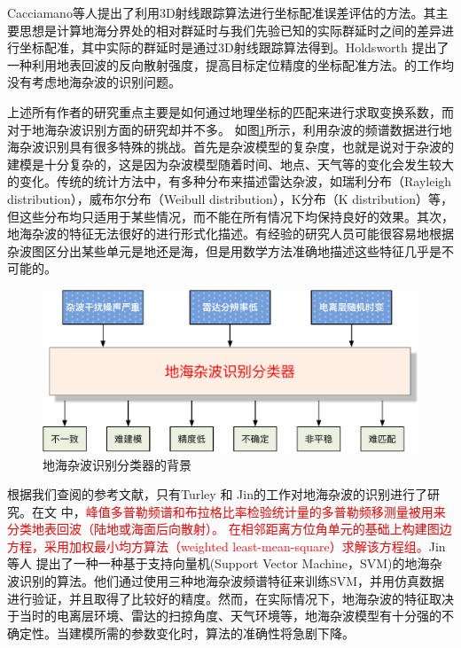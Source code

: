 Cacciamano\cite{cacciamano2012coordinate}等人提出了利用3D射线跟踪算法进行坐标配准误差评估的方法。其主要思想是计算地海分界处的相对群延时与我们先验已知的实际群延时之间的差异进行坐标配准，其中实际的群延时是通过3D射线跟踪算法得到。Holdsworth \cite{holdsworth2017skywave} 提出了一种利用地表回波的反向散射强度，提高目标定位精度的坐标配准方法。\cite{weijers1995oth, fabrizio2016using, wheadon1994ionospheric, anderson1995auto, cuccoli2009over, cuccoli2009over2, cuccoli2010sea, cuccoli2011coordinate, cacciamano2012coordinate}的工作均没有考虑地海杂波的识别问题。


上述所有作者的研究重点主要是如何通过地理坐标的匹配来进行求取变换系数，而对于地海杂波识别方面的研究却并不多。
如图\ref{fig:clutterproblem}所示，利用杂波的频谱数据进行地海杂波识别具有很多特殊的挑战。首先是杂波模型的复杂度，也就是说对于杂波的建模是十分复杂的，这是因为杂波模型随着时间、地点、天气等的变化会发生较大的变化。传统的统计方法中，有多种分布来描述雷达杂波，如瑞利分布（Rayleigh distribution），威布尔分布（Weibull distribution），K分布（K distribution）等，但这些分布均只适用于某些情况，而不能在所有情况下均保持良好的效果。其次，地海杂波的特征无法很好的进行形式化描述。有经验的研究人员可能很容易地根据杂波图区分出某些单元是地还是海，但是用数学方法准确地描述这些特征几乎是不可能的。
\begin{figure}[htb]
	\centering
	\includegraphics[width=\textwidth]{figures/othr/othr_classification.pdf}
	\caption{地海杂波识别分类器的背景}
	\label{fig:clutterproblem}
\end{figure}
根据我们查阅的参考文献，只有Turley\cite{turley2013high} 和 Jin\cite{jin2012svm}的工作对地海杂波的识别进行了研究。在文 \cite{turley2013high}中，\textcolor{red}{峰值多普勒频谱和布拉格比率检验统计量的多普勒频移测量被用来分类地表回波（陆地或海面后向散射）。 在相邻距离方位角单元的基础上构建图边方程，采用加权最小均方算法（weighted least-mean-square）求解该方程组。}Jin等人\cite{jin2012svm} 提出了一种一种基于支持向量机(Support Vector Machine，SVM)的地海杂波识别的算法。他们通过使用三种地海杂波频谱特征来训练SVM，并用仿真数据进行验证，并且取得了比较好的精度。然而，在实际情况下，地海杂波的特征取决于当时的电离层环境、雷达的扫掠角度、天气环境等，地海杂波模型有十分强的不确定性。当建模所需的参数变化时，算法的准确性将急剧下降。

